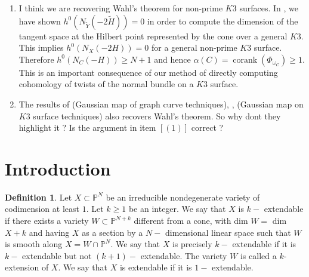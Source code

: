 \documentclass[11pt,twoside]{amsart}
\theoremstyle{plain}
\numberwithin{equation}{section}
\theoremstyle{definition}
\newtheorem{definition}[theorem]{Definition}
\begin{document}
\begin{enumerate}
    \item I think we are recovering Wahl's theorem for non-prime  $K3$ surfaces. 
    In , we have shown $h^0(N_{\widetilde{Y}}(-2\widetilde{H})) = 0$ in order to compute the dimension of the tangent space at the Hilbert point represented by the cone over a general $K3$. This implies $h^0(N_{X}(-2H)) = 0$ for a general non-prime $K3$ surface. Therefore $h^0(N_{C}(-H)) \geq N+1$ and hence $\alpha(C) = \operatorname{corank}(\Phi_{\omega_{C}}) \geq 1$. This is an important consequence of our method of directly computing cohomology of twists of the normal bundle on a $K3$ surface. 
    
    
    \item The results of \cite[Lemma $4$]{CLM93} (Gaussian map of graph curve techniques), \cite{CLM94}, \cite[Proposition $2.22$]{CLM98} (Gaussian map on $K3$ surface techniques) also recovers Wahl's theorem. So why dont they highlight it ? Is the argument in item $[(1)]$ correct ?
\end{enumerate}

\section{Introduction}

\begin{definition}\label{extendability}
Let $X \subset \mathbb{P}^N$ be an irreducible nondegenerate variety of codimension at least $1$. Let $k \geq 1$ be an integer. We say that $X$ is $k-$ extendable if there exists a variety $W \subset \mathbb{P}^{N+k}$
different from a cone, with dim $W =$ dim $X + k$ and having $X$ as a section by a $N-$ dimensional linear space such that $W$ is smooth along $X = W \cap \mathbb{P}^N$. We say that $X$ is precisely $k-$ extendable if it is $k-$ extendable but not $(k + 1)-$ extendable. The variety $W$ is called a $k$-extension of $X$. We say that $X$ is extendable if it is $1-$ extendable.  
\end{definition}
\end{document}
